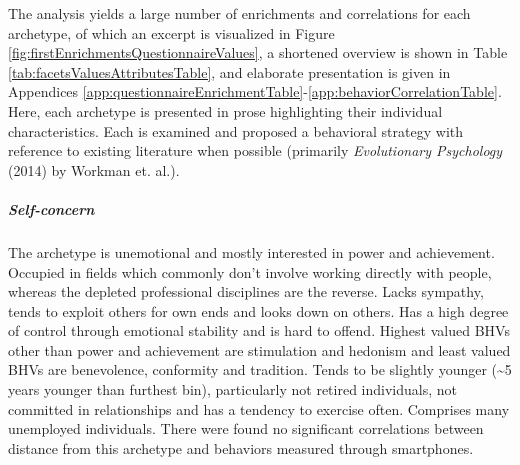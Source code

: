 The analysis yields a large number of enrichments and correlations for each archetype, of which an excerpt is visualized in Figure \ref{fig:firstEnrichmentsQuestionnaireValues}, a shortened overview is shown in Table \ref{tab:facetsValuesAttributesTable}, and elaborate presentation is given in Appendices \ref{app:questionnaireEnrichmentTable}-\ref{app:behaviorCorrelationTable}. 
Here, each archetype is presented in prose highlighting their individual characteristics.
Each is examined and proposed a behavioral strategy with reference to existing literature when possible (primarily \textit{Evolutionary Psychology} (2014) by Workman et. al.).


\subparagraph*{Self-concern}
The \achiever archetype is unemotional and mostly interested in power and achievement.
Occupied in fields which commonly don't involve working directly with people, whereas the depleted professional disciplines are the reverse.
Lacks sympathy, tends to exploit others for own ends and looks down on others.
Has a high degree of control through emotional stability and is hard to offend.
Highest valued BHVs other than power and achievement are stimulation and hedonism and least valued BHVs are benevolence, conformity and tradition.
Tends to be slightly younger (\textasciitilde5 years younger than furthest bin), particularly not retired individuals, not committed in relationships and has a tendency to exercise often.
Comprises many unemployed individuals.
There were found no significant correlations between distance from this archetype and behaviors measured through smartphones.

